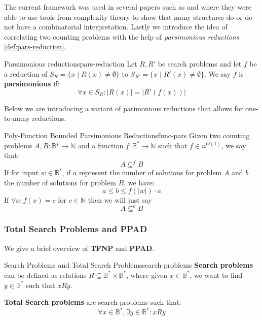 The current framework was used in several papers such as
\cite{ikenmeyer_WhatWhatNot_2022} and \cite{ikenmeyer_PositivitySymmetricGroup_2024}
where they were able to use tools from complexity theory to show that
many structures do or do not have a combinatorial interpretation.
Lastly we introduce the idea of correlating two counting problems with the help of
\textit{parsimonious reductions} \ref{def:pars-reduction}.


\begin{definitionbox}{Parsimonious reductions}{pars-reduction}
    Let $R, R'$ be search problems and let $f$ be a reduction of
    $S_R = \{x \mid R(x) \neq \emptyset \}$ to $S_{R'} = \{x \mid R'(x) \neq \emptyset \}$.
    We say $f$ is \textbf{parsimonious} if:
    $$
    \forall x \in S_R : |R(x)| = |R'(f(x))|
    $$ 
\end{definitionbox}

Below we are introducing a variant of parimonious reductions that allows
for one-to-many reductions. 
\begin{definitionbox}{Poly-Function Bounded Parsimonious Reductions}{func-pars}
    Given two counting problems $A, B : \mathbb{B}* \to \mathbb{N}$
    and a function $f : \mathbb{B}^{*} \to \mathbb{N}$ such that $f \in n^{O(1)}$, we
    say that:
    $$
    A \subseteq^f B
    $$
    If for input $w \in \mathbb{B}^*$, if $a$ represent the number of solutions
    for problem $A$ and $b$ the number of solutions for problem $B$, we have:
    $$
    a \leq b \leq f(|w|) \cdot a
    $$
    If $\forall x : f(x) = c$ for $c \in \mathbb{N}$ then we will just say 
    $$
    A \subseteq^c B
    $$
\end{definitionbox}

\subsubsection{Total Search Problems and PPAD}
We give a brief overview of \textbf{TFNP} and \textbf{PPAD}.


\begin{definitionbox}{Search Problems and Total Search Problems}{search-problems}
    \textbf{Search problems} can be defined as relations $R \subseteq \mathbb{B}^* \times \mathbb{B}^*$,
    where given $x \in \mathbb{B}^*$, we want to find $y \in \mathbb{B}^*$  such that $x Ry$.

    \textbf{Total Search problems} are search problems such that:
    $$
    \forall x \in \mathbb{B}^*, \exists y \in \mathbb{B}^* : xRy
    $$
\end{definitionbox}



